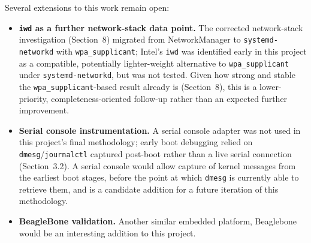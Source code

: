 \documentclass[11pt,a4paper]{article}
\begin{document}
Several extensions to this work remain open:

\begin{itemize}
    \item \textbf{\texttt{iwd} as a further network-stack data point.} The corrected network-stack investigation (Section~8) migrated from NetworkManager to \texttt{systemd-networkd} with \texttt{wpa\_supplicant}; Intel's \texttt{iwd} was identified early in this project as a compatible, potentially lighter-weight alternative to \texttt{wpa\_supplicant} under \texttt{systemd-networkd}, but was not tested. Given how strong and stable the \texttt{wpa\_supplicant}-based result already is (Section~8), this is a lower-priority, completeness-oriented follow-up rather than an expected further improvement.
    
    \item \textbf{Serial console instrumentation.} A serial console adapter was not used in this project's final methodology; early boot debugging relied on \texttt{dmesg}/\texttt{journalctl} captured post-boot rather than a live serial connection (Section~3.2). A serial console would allow capture of kernel messages from the earliest boot stages, before the point at which \texttt{dmesg} is currently able to retrieve them, and is a candidate addition for a future iteration of this methodology.
    
    \item \textbf{BeagleBone validation.} Another similar embedded platform, Beaglebone would be an interesting addition to this project.
    

\end{itemize}
\end{document}
